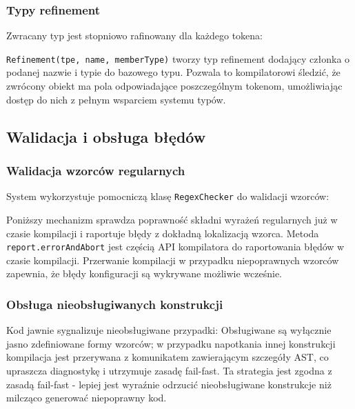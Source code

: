 \subsubsection{Typy refinement}\label{subsubsec:typy-refinement}

Zwracany typ jest stopniowo rafinowany dla każdego tokena:



\texttt{Refinement(tpe, name, memberType)} tworzy typ refinement dodający członka o podanej nazwie i typie do bazowego typu.
Pozwala to kompilatorowi śledzić, że zwrócony obiekt ma pola odpowiadające poszczególnym tokenom, umożliwiając dostęp do nich z pełnym wsparciem systemu typów.

\subsection{Walidacja i obsługa błędów}\label{subsec:walidacja-i-obsuga-bedow}

\subsubsection{Walidacja wzorców regularnych}\label{subsubsec:walidacja-wzorcow-regularnych}

System wykorzystuje pomocniczą klasę \texttt{RegexChecker} do walidacji wzorców:

Poniższy mechanizm sprawdza poprawność składni wyrażeń regularnych już w czasie kompilacji i raportuje błędy z dokładną lokalizacją wzorca.
Metoda \texttt{report.errorAndAbort} jest częścią API kompilatora do raportowania błędów w czasie kompilacji.
Przerwanie kompilacji w przypadku niepoprawnych wzorców zapewnia, że błędy konfiguracji są wykrywane możliwie wcześnie.

\subsubsection{Obsługa nieobsługiwanych konstrukcji}\label{subsubsec:obsuga-nieobsugiwanych-konstrukcji}

Kod jawnie sygnalizuje nieobsługiwane przypadki:
Obsługiwane są wyłącznie jasno zdefiniowane formy wzorców; w przypadku napotkania innej konstrukcji kompilacja jest przerywana z komunikatem zawierającym szczegóły AST, co upraszcza diagnostykę i utrzymuje zasadę fail-fast.
Ta strategia jest zgodna z zasadą fail-fast - lepiej jest wyraźnie odrzucić nieobsługiwane konstrukcje niż milcząco generować niepoprawny kod.

